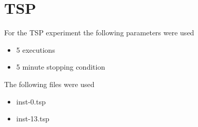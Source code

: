 \section{TSP}

For the TSP experiment the following parameters were used

\begin{itemize}
  \item 5 executions
  \item 5 minute stopping condition
\end{itemize}

The following files were used 

\begin{itemize}
  \item inst-0.tsp
  \item inst-13.tsp
\end{itemize}